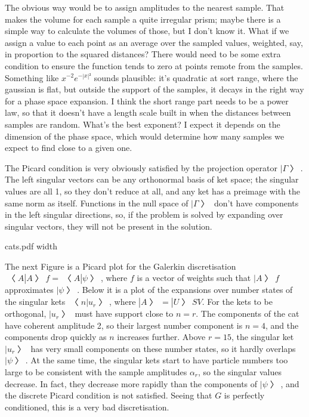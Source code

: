 The obvious way would be to assign amplitudes to the nearest sample.  That makes the volume for each sample a quite irregular prism; maybe there is a simple way to calculate the volumes of those, but I don't know it.  What if we assign a value to each point as an average over the sampled values, weighted, say, in proportion to the squared distances?  There would need to be some extra condition to ensure the function tends to zero at points remote from the samples.  Something like $x^{-2}e^{-|x|²}$ sounds plausible: it's quadratic at sort range, where the gaussian is flat, but outside the support of the samples, it decays in the right way for a phase space expansion.  I think the short range part needs to be a power law, so that it doesn't have a length scale built in when the distances between samples are random.  What's the best exponent?  I expect it depends on the dimension of the phase space, which would determine how many samples we expect to find close to a given one.

The Picard condition is very obviously satisfied by the projection operator $|Γ〉$.  The left singular vectors can be any orthonormal basis of ket space; the singular values are all 1, so they don't reduce at all, and any ket has a preimage with the same norm as itself.  Functions in the null space of $|Γ〉$ don't have components in the left singular directions, so, if the problem is solved by expanding over singular vectors, they will not be present in the solution. 

\topinsert\XeTeXpicfile cats.pdf width \hsize\endinsert

The next Figure is a Picard plot for the Galerkin discretisation $〈A|A〉f=〈A|ψ〉$, where $f$ is a vector of weights such that $|A〉f$ approximates $|ψ〉$.  Below it is a plot of the expansions over number states of the singular kets $〈n|u_r〉$, where $|A〉=|U〉SV$.  For the kets to be orthogonal, $|u_r〉$ must have support close to $n=r$.  The components of the cat have coherent amplitude 2, so their largest number component is $n=4$, and the components drop quickly as $n$ increases further.  Above $r=15$, the singular ket $|u_r〉$ has very small components on these number states, so it hardly overlaps $|ψ〉$.  At the same time, the singular kets start to have particle numbers too large to be consistent with the sample amplitudes $α_r$, so the singular values decrease.  In fact, they decrease more rapidly than the components of $|ψ〉$, and the discrete Picard condition is not satisfied.  Seeing that $G$ is perfectly conditioned, this is a very bad discretisation.

